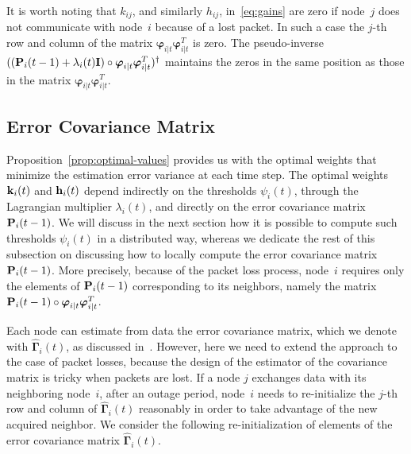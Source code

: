 \documentclass[a4paper,notitlepage,onecolumn]{article}
\def\P{\mathds{P}}
\def\I{{\cal I}}
\def\k{{\bf k}}
\def\h{{\bf h}}
\def\I{{\bf I}}
\def\P{{\bf P}}
\def\varphib{\boldsymbol{\varphi}}
\def\Gammab{\boldsymbol{\Gamma}}
\numberwithin{equation}{section}
\begin{document}
It is worth noting that $k_{ij}$, and similarly $h_{ij}$,
in~\eqref{eq:gains} are zero if node~$j$ does not communicate with
node~$i$ because of a lost packet. In such a case the $j$-th
row and column of the matrix $\varphib_{i|t}\varphib_{i|t}^T$ is
zero. The pseudo-inverse $((\P_i(t-1)+\lambda_i(t) \I) \circ
\varphib_{i|t}\varphib_{i|t}^T)^\dag$ maintains the zeros in the
same position as those in the matrix
$\varphib_{i|t}\varphib_{i|t}^T$.

\subsection{Error Covariance Matrix}

Proposition~\ref{prop:optimal-values} provides us with the optimal
weights that minimize the estimation error variance at each time
step. The optimal weights $\k_i(t)$ and $\h_i(t)$ depend
indirectly on the thresholds $\psi_i(t)$, through the Lagrangian
multiplier $\lambda_i(t)$, and directly on the error covariance
matrix $\P_i(t-1)$. We will discuss in the next section how it is
possible to compute such thresholds $\psi_i(t)$ in a distributed
way, whereas we dedicate the rest of this subsection on discussing
how to locally compute the error covariance matrix $\P_i(t-1)$.
More precisely, because of the packet loss process, node~$i$
requires only the elements of $\P_i(t-1)$ corresponding to its
neighbors, namely the matrix $\P_i(t-1) \circ
\varphib_{i|t}\varphib_{i|t}^T$.

Each node can estimate from data the error covariance matrix,
which we denote with $\hat{\Gammab}_i(t)$, as discussed
in~\cite{JSAC07}. However, here we need to extend the approach to
the case of packet losses, because the design of the estimator of
the covariance matrix is tricky when packets are lost. If a node
$j$ exchanges data with its neighboring node~$i$, after an outage
period, node~$i$ needs to re-initialize the $j$-th row and column
of $\hat{\Gammab}_i(t)$ reasonably in order to take advantage of
the new acquired neighbor. We consider the following
re-initialization of elements of the error covariance matrix
$\hat{\Gammab}_i(t)$.
\end{document}

